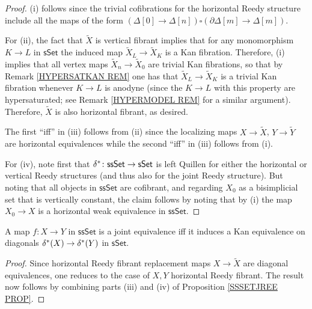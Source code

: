 \documentclass[a4paper,10pt
 ,draft
]{article}%
\begin{document}
\begin{proof}
(i) follows since the trivial cofibrations for the horizontal Reedy structure include all the maps of the form
$(\Delta[0] \to \Delta[n]) \square (\partial \Delta[m] \to \Delta[m])$.

For (ii), the fact that $\tilde{X}$ is vertical fibrant
implies that for any monomorphism $K \to L$ in $\mathsf{sSet}$
the induced map $\tilde{X}_L \to \tilde{X}_K$ is a Kan fibration. Therefore, (i) implies that all vertex maps
$\tilde{X}_{n} \to \tilde{X}_{0}$
are trivial Kan fibrations, so that by
Remark \ref{HYPERSATKAN REM} one has that 
$\tilde{X}_L \to \tilde{X}_K$ is a trivial Kan fibration whenever
$K \to L$ is anodyne
(since the $K \to L$ with this property are hypersaturated; see Remark \ref{HYPERMODEL REM} for a similar argument).
Therefore, $\tilde{X}$ is also horizontal fibrant, as desired.


The first ``iff'' in (iii) follows from (ii) since the localizing maps 
$X \to \tilde{X}$, $Y \to \tilde{Y}$
are horizontal equivalences
while the second ``iff'' in (iii) follows from (i).

For (iv), note first that 
$\delta^{\**} \colon \mathsf{ssSet} \to \mathsf{sSet}$
is left Quillen for either the horizontal or vertical Reedy structures (and thus also for the joint Reedy structure).
But noting that all objects in $\mathsf{ssSet}$ are cofibrant, and regarding 
$X_{0}$ as a bisimplicial set that is vertically constant, 
the claim follows by noting that by (i) the map
$X_{0} \to X$ is a horizontal weak equivalence in $\mathsf{ssSet}$.
\end{proof}


\begin{corollary}\label{WEAKDIAG COR}
	A map $f\colon X \to Y$ in $\mathsf{ssSet}$ is a joint equivalence iff it induces a Kan equivalence on diagonals
	$\delta^{\**}(X) \to \delta^{\**}(Y)$ in $\mathsf{sSet}$.
\end{corollary}

\begin{proof}
	Since horizontal Reedy fibrant replacement maps
	$X \to \tilde{X}$ are diagonal equivalences, 
	one reduces to the case of $X,Y$ horizontal Reedy fibrant. The result now follows by combining
	parts (iii) and (iv) of Proposition \ref{SSSETJREE PROP}.
\end{proof}
\end{document}

